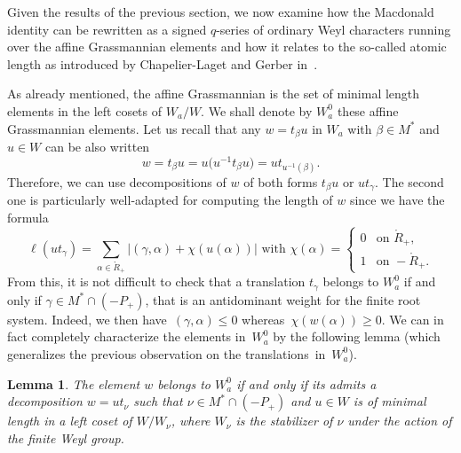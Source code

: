 \documentclass[pdftex]{sigma}
\newtheorem{Lemma}[Theorem]{Lemma}
\numberwithin{equation}{section}
\begin{document}
Given the results of the previous section, we now examine how the Macdonald identity can be rewritten as a signed $q$-series of
	ordinary Weyl characters running over the affine Grassmannian elements and how it relates to the so-called atomic length as introduced by Chapelier-Laget and Gerber in~\cite{CGT}.
	
As already mentioned, the affine Grassmannian is the set of minimal length
elements in the left cosets of $W_{a}/W$. We shall denote by $W_{a}^{0}$ these
affine Grassmannian elements. Let us recall that any $w=t_{\beta}u$ in $W_{a}$
with $\beta\in M^{\ast}$ and $u\in W$ can be also written
\[
w=t_{\beta}u=u\bigl(u^{-1}t_{\beta}u\bigr)=ut_{u^{-1}(\beta)}.
\]
Therefore, we can use decompositions of $w$ of both forms $t_{\beta}u$ or
$ut_{\gamma}$. The second one is particularly well-adapted for computing the
length of $w$ since we have the formula%
\[
\ell(ut_{\gamma})=\sum_{\alpha\in\mathring{R}_{+}}\vert (\gamma
,\alpha)+\chi(u(\alpha)) \vert \text{ with }\chi(\alpha)=
\begin{cases}
0&\text{on }\mathring{R}_{+},\\
1&\text{on } {-}\mathring{R}_{+}.
\end{cases}
\]
From this, it is not difficult to check that a translation $t_{\gamma}$
belongs to $W_{a}^{0}$ if and only if ${\gamma\in M^{\ast}\cap(-P_{+})}$, that
is an antidominant weight for the finite root system. Indeed, we then have~${(\gamma,\alpha)\leq0}$ whereas~${\chi(w(\alpha))\geq0}$. We can in fact
completely characterize the elements in~$W_{a}^{0}$ by the following lemma
\big(which generalizes the previous observation on the translations~in~$W_{a}^{0}$\big).

\begin{Lemma}
	The element $w$ belongs to $W_{a}^{0}$ if and only if its admits a
	decomposition $w=ut_{\nu}$ such that $\nu\in M^{\ast}\cap(-P_{+})$ and $ u\in
	W$ is of minimal length in a left coset of $W/W_{\nu}$, where $W_{\nu}$ is the
	stabilizer of $\nu$ under the action of the finite Weyl group.
\end{Lemma}
\end{document}
